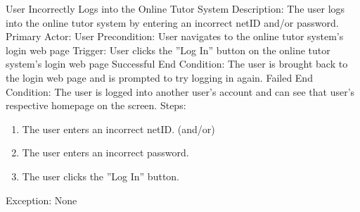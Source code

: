     \begin{section}{User Incorrectly Logs into the Online Tutor System}
        Description: The user logs into the online tutor system by entering an incorrect netID and/or password. \newline
        Primary Actor: User \newline
        Precondition: User navigates to the online tutor system's login web page \newline
        Trigger: User clicks the ''Log In'' button on the online tutor system's login web page \newline
        Successful End Condition: The user is brought back to the login web page and is prompted to try logging in again. \newline
        Failed End Condition: The user is logged into another user's account and can see that user's respective homepage on the screen. \newline
        \newline
        Steps:
        \begin{enumerate}
            \item{The user enters an incorrect netID. \newline
	              (and/or)}
            \item{The user enters an incorrect password.}
            \item{The user clicks the ''Log In'' button.}
        \end{enumerate}
        Exception: None
    \end{section}
    
